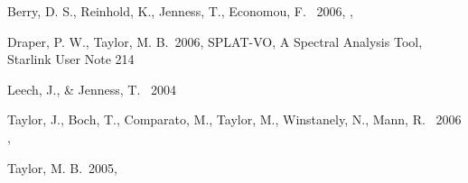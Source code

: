 \documentclass[11pt,twoside]{article}  %
\begin{document}
%
%
%
\begin{references}
 Berry, D. S., Reinhold, K., Jenness, T., Economou, F. 
           \ 2006, \adassxvi, 

 Draper, P. W., Taylor, M. B.\  2006, SPLAT-VO, 
           A Spectral Analysis Tool, Starlink User Note 214

 Leech, J., \& Jenness, T. \ 2004 \adassxiv

 Taylor, J., Boch, T., Comparato, M., Taylor, M., 
           Winstanely, N., Mann, R. \ 2006 \adassxvi, 

 Taylor, M. B.\ 2005, \adassxiv


\end{references}

\end{document}
